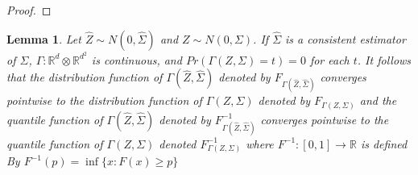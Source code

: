 \documentclass{article}
\newtheorem{lemma}[theorem]{Lemma}
\newcommand{\rvv}{Z}
\newcommand{\gamestz}{\Gamma(\hat{\rvv}, \hat{\Sigma})}
\newcommand{\gamz}{\Gamma(\rvv, \Sigma)}
\begin{document}
\begin{proof}



\end{proof}

\begin{lemma}
	\label{lemma:gamma_conv}
	Let $\hat{Z} \sim N(0, \hat{\Sigma})$ and $Z \sim N(0, \Sigma)$. If $\hat{\Sigma}$ is a consistent estimator of $\Sigma$, $\Gamma : \mathbb{R}^{d} \otimes \mathbb{R}^{d^2}$ is continuous, and $Pr(\Gamma(Z, \Sigma) = t) = 0$ for each $t$.  It follows that the distribution function of $\Gamma(\hat{Z}, \hat{\Sigma})$ denoted by $F_{\Gamma(\hat{Z}, \hat{\Sigma})}$ converges pointwise to the distribution function of $\Gamma(Z, \Sigma)$ denoted by $F_{\gamz}$ and the quantile function of $\gamestz$ denoted by $F^{-1}_{\gamestz}$ converges pointwise to the quantile function of $\gamz$ denoted $F^{-1}_{\gamz}$ where $F^{-1} : [0, 1] \to \mathbb{R}$ is defined By $F^{-1}(p) = \inf\{x : F(x) \geq p\}$
\end{lemma}
\end{document}
